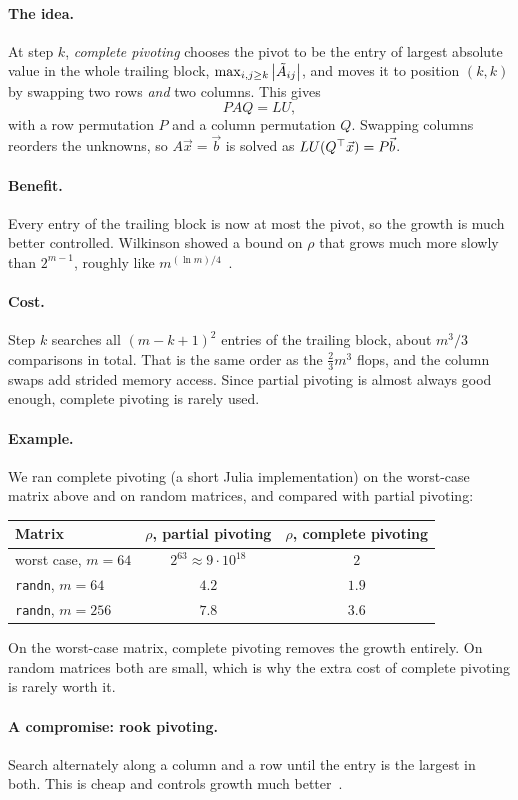 \paragraph{The idea.} At step $k$, \emph{complete pivoting} chooses the pivot to be the entry of largest absolute value in the whole trailing block, $\max_{i,j \ge k}\left\lvert \tilde{A}_{ij} \right\rvert$, and moves it to position $(k, k)$ by swapping two rows \emph{and} two columns. This gives
\begin{equation}
  PAQ = LU,
\end{equation}
with a row permutation $P$ and a column permutation $Q$. Swapping columns reorders the unknowns, so $A\vec{x} = \vec{b}$ is solved as $LU(Q^\top\vec{x}) = P\vec{b}$.

\paragraph{Benefit.} Every entry of the trailing block is now at most the pivot, so the growth is much better controlled. Wilkinson showed a bound on $\rho$ that grows much more slowly than $2^{m-1}$, roughly like $m^{(\ln m)/4}$~\cite[Chapter 9]{Higham}.

\paragraph{Cost.} Step $k$ searches all $(m - k + 1)^2$ entries of the trailing block, about $m^3/3$ comparisons in total. That is the same order as the $\tfrac{2}{3}m^3$ flops, and the column swaps add strided memory access. Since partial pivoting is almost always good enough, complete pivoting is rarely used.

\paragraph{Example.} We ran complete pivoting (a short Julia implementation) on the worst-case matrix above and on random matrices, and compared with partial pivoting:
\begin{center}
\begin{tabular}{lcc}
  \toprule
  Matrix & $\rho$, partial pivoting & $\rho$, complete pivoting \\
  \midrule
  worst case, $m = 64$ & $2^{63} \approx 9 \cdot 10^{18}$ & $2$ \\
  \texttt{randn}, $m = 64$ & $4.2$ & $1.9$ \\
  \texttt{randn}, $m = 256$ & $7.8$ & $3.6$ \\
  \bottomrule
\end{tabular}
\end{center}
On the worst-case matrix, complete pivoting removes the growth entirely. On random matrices both are small, which is why the extra cost of complete pivoting is rarely worth it.

\paragraph{A compromise: rook pivoting.} Search alternately along a column and a row until the entry is the largest in both. This is cheap and controls growth much better~\cite[Chapter 9]{Higham}.
